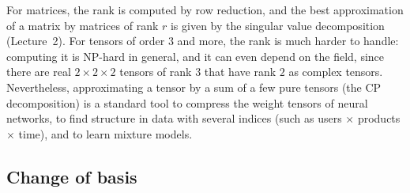\begin{remark}
    For matrices, the rank is computed by row reduction, and the best approximation of a matrix by matrices of rank $r$ is given by the singular value decomposition (Lecture~2). For tensors of order $3$ and more, the rank is much harder to handle: computing it is NP-hard in general, and it can even depend on the field, since there are real $2 \times 2 \times 2$ tensors of rank $3$ that have rank $2$ as complex tensors. Nevertheless, approximating a tensor by a sum of a few pure tensors (the CP decomposition) is a standard tool to compress the weight tensors of neural networks, to find structure in data with several indices (such as users $\times$ products $\times$ time), and to learn mixture models.
\end{remark}

\subsection{Change of basis}\label{L1-subsec:tensor-basis-change}

